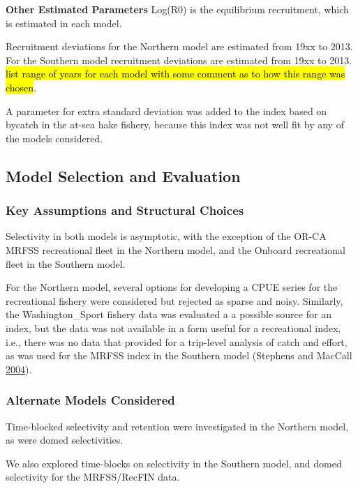 \documentclass[12pt,]{article}
\begin{document}
\textbf{Other Estimated Parameters} Log(R0) is the equilibrium
recruitment, which is estimated in each model.

Recruitment deviations for the Northern model are estimated from 19xx to
2013. For the Southern model recruitment deviations are estimated from
19xx to 2013.
\hl{list range of years for each model with some comment as to how this range was chosen}.

A parameter for extra standard deviation was added to the index based on
bycatch in the at-sea hake fishery, because this index was not well fit
by any of the models considered.

\clearpage

\subsection{Model Selection and
Evaluation}\label{model-selection-and-evaluation}

\subsubsection{Key Assumptions and Structural
Choices}\label{key-assumptions-and-structural-choices}

Selectivity in both models is asymptotic, with the exception of the
OR-CA MRFSS recreational fleet in the Northern model, and the Onboard
recreational fleet in the Southern model.

For the Northern model, several options for developing a CPUE series for
the recreational fishery were considered but rejected as sparse and
noisy. Similarly, the Washington\_Sport fishery data was evaluated a a
possible source for an index, but the data was not available in a form
useful for a recreational index, i.e., there was no data that provided
for a trip-level analysis of catch and effort, as was used for the MRFSS
index in the Southern model (Stephens and MacCall
\protect\hyperlink{ref-Stephens2004}{2004}).

\subsubsection{Alternate Models
Considered}\label{alternate-models-considered}

Time-blocked selectivity and retention were investigated in the Northern
model, as were domed selectivities.

We also explored time-blocks on selectivity in the Southern model, and
domed selectivity for the MRFSS/RecFIN data.
\end{document}
